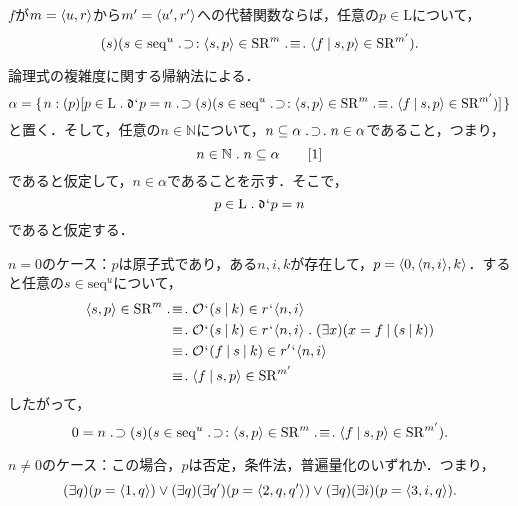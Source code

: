 \begin{thm}
\label{thm:代替モデル充足}
$f$が$ m = \langle u,r \rangle $から$ m' = \langle u',r' \rangle $への代替関数ならば，任意の$p\in\mathrm{L}$について，
\[
    (s)(s\in \mathrm{seq}^u\case{1}{1}{2}\orp{s,p}\in\mathrm{SR}^m\case{3}{1}{1}\orp{f\resl s,p}\in\mathrm{SR}^{m'}).
\]
\end{thm}
\begin{pfx}
\setcounter{equation}{0}
論理式の複雑度に関する帰納法による．
\[
    \alpha = \classab{n:
        (p)[p\in\mathrm{L}\con{1}\mathfrak{d}\fap p = n\case{1}{1}{0}
            (s)(s\in \mathrm{seq}^u\case{1}{1}{2}\orp{s,p}\in\mathrm{SR}^m\case{3}{1}{1}\orp{f\resl s,p}\in\mathrm{SR}^{m'})
        ]
    }
\]
と置く．そして，任意の$ n\in\mathbb{N} $について，$ n\subseteq \alpha\case{1}{1}{1}n\in\alpha $であること，つまり，
\begin{equation}
    n\in\mathbb{N}\con{1}n\subseteq\alpha \tag*{[1]}
\end{equation}
であると仮定して，$ n\in\alpha $であることを示す．そこで，
\begin{equation}
    p\in\mathrm{L}\con{1}\mathfrak{d}\fap p = n
\end{equation}
であると仮定する．

$n = 0$のケース：$p$は原子式であり，ある$n,i,k$が存在して，$ p = \langle 0,\langle n,i \rangle,k \rangle $．すると任意の$s\in \mathrm{seq}^u$について，
\begin{align*}
    \orp{s,p}\in \mathrm{SR}^m & \case{3}{1}{1} \mathcal{O}\fap (s \resl k)\in r\fap\orp{n,i}\\
    &\:\, \case{3}{0}{1} \mathcal{O}\fap (s \resl k)\in r\fap\orp{n,i}\con{1}(\exists x)(x = f\resl(s \resl k))\\
    &\:\, \case{3}{0}{1} \mathcal{O}\fap (f\resl s \resl k)\in r'\fap\orp{n,i}\\
    &\:\, \case{3}{0}{1} \orp{f\resl s,p}\in \mathrm{SR}^{m'}
\end{align*}
したがって，
\begin{equation}
    0 = n\case{1}{1}{0}(s)(s\in \mathrm{seq}^u\case{1}{1}{2}\orp{s,p}\in\mathrm{SR}^m\case{3}{1}{1}\orp{f\resl s,p}\in\mathrm{SR}^{m'}).
\end{equation}

$n \neq 0$のケース：この場合，$p$は否定，条件法，普遍量化のいずれか．つまり，
\begin{equation*}
    (\exists q)(p = \orp{1,q})\case{2}{0}{0}(\exists q)(\exists q')(p = \orp{2,q,q'})\case{2}{0}{0}(\exists q)(\exists i)(p = \orp{3,i,q}).
\end{equation*}


\end{pfx}
